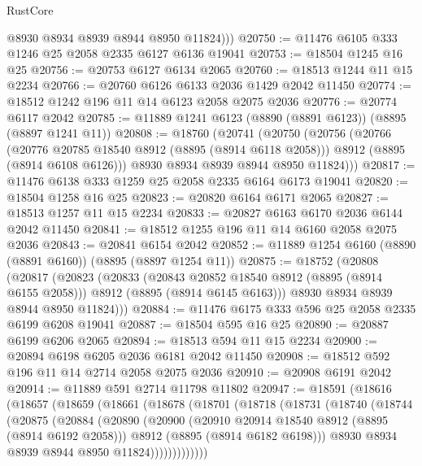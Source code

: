 \begin{lexlean}{RustCore}
\begin{coremodule}
          @8930
          @8934
          @8939
          @8944
          @8950
          @11824)))
@20750 := @11476 @6105 @333 @1246 @25 @2058 @2335 @6127 @6136 @19041
@20753 := @18504 @1245 @16 @25
@20756 := @20753 @6127 @6134 @2065
@20760 := @18513 @1244 @11 @15 @2234
@20766 := @20760 @6126 @6133 @2036 @1429 @2042 @11450
@20774 := @18512 @1242 @196 @11 @14 @6123 @2058 @2075 @2036
@20776 := @20774 @6117 @2042
@20785 := @11889 @1241 @6123 (@8890 (@8891 @6123)) (@8895 (@8897 @1241 @11))
@20808 := @18760
    (@20741
      (@20750
        (@20756
          (@20766
            (@20776 @20785 @18540 @8912 (@8895 (@8914 @6118 @2058)))
            @8912
            (@8895 (@8914 @6108 @6126)))
          @8930
          @8934
          @8939
          @8944
          @8950
          @11824)))
@20817 := @11476 @6138 @333 @1259 @25 @2058 @2335 @6164 @6173 @19041
@20820 := @18504 @1258 @16 @25
@20823 := @20820 @6164 @6171 @2065
@20827 := @18513 @1257 @11 @15 @2234
@20833 := @20827 @6163 @6170 @2036 @6144 @2042 @11450
@20841 := @18512 @1255 @196 @11 @14 @6160 @2058 @2075 @2036
@20843 := @20841 @6154 @2042
@20852 := @11889 @1254 @6160 (@8890 (@8891 @6160)) (@8895 (@8897 @1254 @11))
@20875 := @18752
    (@20808
      (@20817
        (@20823
          (@20833
            (@20843 @20852 @18540 @8912 (@8895 (@8914 @6155 @2058)))
            @8912
            (@8895 (@8914 @6145 @6163)))
          @8930
          @8934
          @8939
          @8944
          @8950
          @11824)))
@20884 := @11476 @6175 @333 @596 @25 @2058 @2335 @6199 @6208 @19041
@20887 := @18504 @595 @16 @25
@20890 := @20887 @6199 @6206 @2065
@20894 := @18513 @594 @11 @15 @2234
@20900 := @20894 @6198 @6205 @2036 @6181 @2042 @11450
@20908 := @18512 @592 @196 @11 @14 @2714 @2058 @2075 @2036
@20910 := @20908 @6191 @2042
@20914 := @11889 @591 @2714 @11798 @11802
@20947 := @18591
    (@18616
      (@18657
        (@18659
          (@18661
            (@18678
              (@18701
                (@18718
                  (@18731
                    (@18740
                      (@18744
                        (@20875
                          (@20884
                            (@20890
                              (@20900
                                (@20910 @20914 @18540 @8912 (@8895 (@8914 @6192 @2058)))
                                @8912
                                (@8895 (@8914 @6182 @6198)))
                              @8930
                              @8934
                              @8939
                              @8944
                              @8950
                              @11824)))))))))))))

\end{coremodule}
\end{lexlean}
